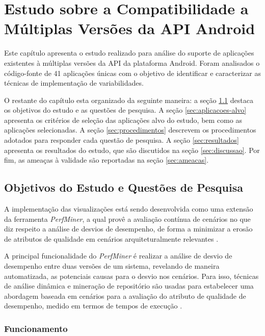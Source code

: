 \chapter{Estudo sobre a Compatibilidade a Múltiplas Versões da API Android}
\label{ch:estudo}

Este capítulo apresenta o estudo realizado para análise do suporte de aplicações
existentes à múltiplas versões da API da plataforma Android. Foram analisados o
código-fonte de 41 aplicações únicas com o objetivo de identificar e caracterizar
as técnicas de implementação de variabilidades.

O restante do capítulo esta organizado da seguinte maneira: 
a seção \ref{sec:objetivos} destaca os objetivos do estudo e as questões de pesquisa.
A seção \ref{sec:aplicacoes-alvo} apresenta os critérios de seleção das aplicações
alvo do estudo, bem como as aplicações selecionadas.
A seção \ref{sec:procedimentos} descrevem os procedimentos adotados para responder
cada questão de pesquisa. 
A seção \ref{sec:resultados} apresenta os resultados do estudo, que são discutidos na
seção \ref{sec:discussao}.
Por fim, as ameaças à validade são reportadas na seção \ref{sec:ameacas}.

\section{Objetivos do Estudo e Questões de Pesquisa} \label{sec:objetivos}

A implementação das visualizações está sendo desenvolvida como uma extensão da ferramenta \textit{PerfMiner}, a qual provê a avaliação contínua de cenários no que diz respeito a análise de desvios de desempenho, de forma a minimizar a erosão de atributos de qualidade em cenários arquiteturalmente relevantes \cite{Pinto2015}.

A principal funcionalidade do \textit{PerfMiner} é realizar a análise de desvio de desempenho entre duas versões de um sistema, revelando de maneira automatizada, as potenciais causas para o desvio nos cenários. Para isso, técnicas de análise dinâmica e mineração de repositório são usadas para estabelecer uma abordagem baseada em cenários para a avaliação do atributo de qualidade de desempenho, medido em termos de tempos de execução \cite{Pinto2015}.

\subsection{Funcionamento} \label{subsec:funcionamento-perfminer}


